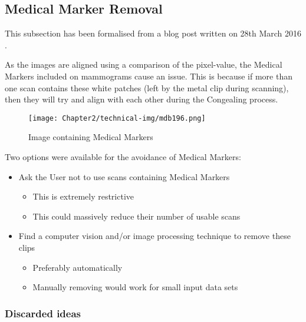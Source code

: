 \subsection{Medical Marker Removal}

This subsection has been formalised from a blog post written on 28th March 2016 \cite{Collins_2016}.

As the images are aligned using a comparison of the pixel-value, the Medical Markers included on mammograms cause an issue. This is because if more than one scan contains these white patches (left by the metal clip during scanning), then they will try and align with each other during the \Gls{Congealing} process.

\begin{figure}[H]
  \centering
  \texttt{[image: Chapter2/technical-img/mdb196.png]}
  \caption{Image containing Medical Markers}
  \label{fig:med-markers}
\end{figure}

Two options were available for the avoidance of Medical Markers:
\begin{itemize}
  \item Ask the User not to use scans containing Medical Markers
  \begin{itemize}
    \item This is extremely restrictive
    \item This could massively reduce their number of usable scans
  \end{itemize}
  \item Find a computer vision and/or image processing technique to remove these clips
  \begin{itemize}
    \item Preferably automatically
    \item Manually removing would work for small input data sets
  \end{itemize}
\end{itemize}

\subsubsection{Discarded ideas}

